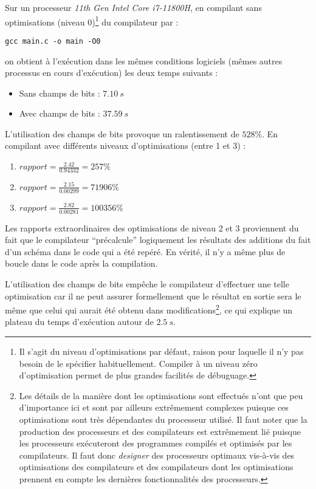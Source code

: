 \documentclass[../../../main.tex]{subfiles}
\begin{document}
Sur un processeur \textit{11th Gen Intel Core i7-11800H}, en compilant sans optimisations (niveau 0)\footnote{Il s'agit du niveau d'optimisations par défaut, raison pour laquelle il n'y pas besoin de le spécifier habituellement. Compiler à un niveau zéro d'optimisation permet de plus grandes facilités de débuguage.} du compilateur par :
\begin{verbatim}
gcc main.c -o main -O0
\end{verbatim}
on obtient à l'exécution dans les mêmes conditions logiciels (mêmes autres processus en cours d'exécution) les deux temps suivants :
\begin{itemize}
	\item Sans champs de bits : $7.10\ s$
	\item Avec champs de bits : $37.59\ s$
\end{itemize}
L'utilisation des champs de bits provoque un ralentissement de $528 \%$.
En compilant avec différents niveaux d'optimisations (entre 1 et 3) :
\begin{enumerate}
	\item $rapport = \frac{2.42}{0.94332} = 257\%$
	\item $rapport = \frac{2.15}{0.00299} = 71906\%$
	\item $rapport = \frac{2.82}{0.00281} = 100356\%$
\end{enumerate}
Les rapports extraordinaires des optimisations de niveau 2 et 3 proviennent du fait que le compilateur ``précalcule'' logiquement les résultats des additions du fait d'un schéma dans le code qui a été repéré. En vérité, il n'y a même plus de boucle dans le code après la compilation.

L'utilisation des champs de bits empêche le compilateur d'effectuer une telle optimisation car il ne peut assurer formellement que le résultat en sortie sera le même que celui qui aurait été obtenu dans modifications\footnote{Les détails de la manière dont les optimisations sont effectués n'ont que peu d'importance ici et sont par ailleurs extrêmement complexes puisque ces optimisations sont très dépendantes du processeur utilisé. Il faut noter que la production des processeurs et des compilateurs est extrêmement lié puisque les processeurs exécuteront des programmes compilés et optimisés par les compilateurs. Il faut donc \textit{designer} des processeurs optimaux vis-à-vis des optimisations des compilateurs et des compilateurs dont les optimisations prennent en compte les dernières fonctionnalités des processeurs.}, ce qui explique un plateau du temps d'exécution autour de $2.5\ s$.
\end{document}
